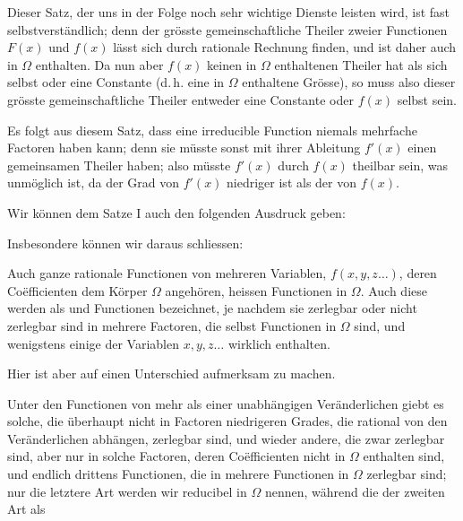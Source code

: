 
Dieser Satz, der uns in der Folge noch sehr wichtige Dienste leisten wird, ist fast selbstverständlich; denn der grösste gemeinschaftliche Theiler zweier Functionen $F(x)$ und $f(x)$ lässt sich durch rationale Rechnung finden, und ist daher auch in $\Omega$ enthalten. Da nun aber $f(x)$ keinen in $\Omega$ enthaltenen Theiler hat als sich selbst oder eine Constante (d.\,h. eine in $\Omega$ enthaltene Grösse), so muss also dieser grösste gemeinschaftliche Theiler entweder eine Constante oder $f(x)$ selbst sein.

Es folgt aus diesem Satz, dass eine irreducible Function niemals mehrfache Factoren haben kann; denn sie müsste sonst mit ihrer Ableitung $f'(x)$ einen gemeinsamen Theiler haben; also müsste $f'(x)$ durch $f(x)$ theilbar sein, was unmöglich ist, da der Grad von $f'(x)$ niedriger ist als der von $f(x)$.

Wir können dem Satze I auch den folgenden Ausdruck geben:


Insbesondere können wir daraus schliessen:


Auch ganze rationale Functionen von mehreren Variablen, $f(x, y, z \ldots)$, deren Co\"efficienten dem Körper $\Omega$ angehören, heissen Functionen in $\Omega$. Auch diese werden als  und  Functionen bezeichnet, je nachdem sie zerlegbar oder nicht zerlegbar sind in mehrere Factoren, die selbst Functionen in $\Omega$ sind, und wenigstens einige der Variablen $x, y, z \ldots$ wirklich enthalten.

Hier ist aber auf einen Unterschied aufmerksam zu machen.

Unter den Functionen von mehr als einer unabhängigen Veränderlichen giebt es solche, die überhaupt nicht in Factoren niedrigeren Grades, die rational von den Veränderlichen abhängen, zerlegbar sind, und wieder andere, die zwar zerlegbar sind, aber nur in solche Factoren, deren Co\"efficienten nicht in $\Omega$ enthalten sind, und endlich drittens Functionen, die in mehrere Functionen in $\Omega$ zerlegbar sind; nur die letztere Art werden wir reducibel in $\Omega$ nennen, während die der zweiten Art als 
